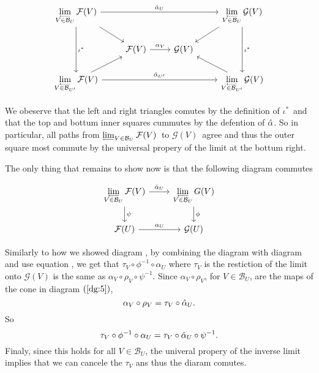 \documentclass[a4paper,11pt,english]{article}
\newcommand{\B}{\mathcal{B}}
\newcommand{\F}{\mathcal{F}}
\newcommand{\G}{\mathcal{G}}
\begin{document}
\begin{exercise}[2]
\renewcommand{\L}[2]{\invlim\limits_{V \in \B_{#2}} #1(V)}

\begin{equation*}
\begin{tikzcd}
 \L{\F}{U} \arrow[rrr, "\ha_U"] \arrow[dd, "\iota^*"] \arrow[rd] &&& 
 \L{\G}{U} \arrow[dd, "\iota^*"] \arrow[ld]  \\
 & \F(V) \arrow[r, "\alpha_V"] & \G(V) \\
 \L{\F}{U'} \arrow[rrr, "\ha_{U'}"] \arrow[ru] &&& 
\L{\G}{U'} \arrow[lu]
\end{tikzcd} 
\end{equation*}

We obeserve that the left and right triangles comutes by the definition of
$\iota^*$ and that the top and bottum inner squares cummutes by the defention of
$\hat{\alpha}$. So in particular, all paths from $\invlim_{V \in \B_U} \F(V)$ to
$\G(V)$ agree and thus the outer square most commute by the universal propery of
the limit at the bottum right.


The only thing that remains to show now is that the following diagram commutes

\begin{equation*}
\begin{tikzcd}
\L{\F}{U} \arrow[r,"\ha_U"] \arrow[d, "\psi"] & \L{G}{U} \arrow[d, "\phi"]\\
\F(U) \arrow[r, "\alpha_U"] & \G(U)
\end{tikzcd}
\end{equation*}

Similarly to how we showed diagram , by combining the diagram with
diagram  and use equation , we get that 
$\tau_V \circ \phi^{-1} \circ \alpha_U$ where $\tau_V$ is the restiction of the
limit onto $\G(V)$ is the same as $\alpha_V \circ \rho_V \circ \psi^{-1}$. Since
$\alpha_V \circ \rho_V$, for $V\in \B_U$, are the maps of the cone in diagram
$\pref{dg:5}$,
\[ \alpha_V \circ \rho_V = \tau_V \circ \hat{\alpha}_U. \]
So 
\[ \tau_V \circ \phi^{-1} \circ \alpha_U = \tau_V\circ \hat{\alpha}_U  \circ \psi^{-1}. \]
Finaly, since this holds for all $V \in \B_U$, the univeral propery of the
inverse limit implies that we can cancele the $\tau_V$ ans thus the diaram
comutes.
\end{exercise}

\newcommand{\tM}{\tilde{M}}
\newcommand{\tm}{\tilde{m}}
\end{document}
